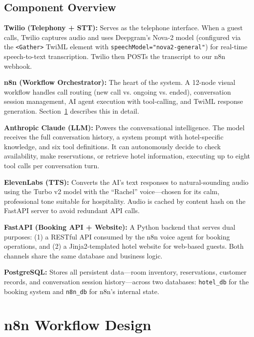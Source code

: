 \documentclass[conference]{IEEEtran}
\begin{document}
\subsection{Component Overview}

\textbf{Twilio (Telephony + STT):} Serves as the telephone interface. When a guest calls, Twilio captures audio and uses Deepgram's Nova-2 model (configured via the \texttt{<Gather>} TwiML element with \texttt{speechModel="nova2-general"}) for real-time speech-to-text transcription. Twilio then POSTs the transcript to our n8n webhook.

\textbf{n8n (Workflow Orchestrator):} The heart of the system. A 12-node visual workflow handles call routing (new call vs. ongoing vs. ended), conversation session management, AI agent execution with tool-calling, and TwiML response generation. Section~\ref{sec:workflow} describes this in detail.

\textbf{Anthropic Claude (LLM):} Powers the conversational intelligence. The model receives the full conversation history, a system prompt with hotel-specific knowledge, and six tool definitions. It can autonomously decide to check availability, make reservations, or retrieve hotel information, executing up to eight tool calls per conversation turn.

\textbf{ElevenLabs (TTS):} Converts the AI's text responses to natural-sounding audio using the Turbo v2 model with the ``Rachel'' voice---chosen for its calm, professional tone suitable for hospitality. Audio is cached by content hash on the FastAPI server to avoid redundant API calls.

\textbf{FastAPI (Booking API + Website):} A Python backend that serves dual purposes: (1) a RESTful API consumed by the n8n voice agent for booking operations, and (2) a Jinja2-templated hotel website for web-based guests. Both channels share the same database and business logic.

\textbf{PostgreSQL:} Stores all persistent data---room inventory, reservations, customer records, and conversation session history---across two databases: \texttt{hotel\_db} for the booking system and \texttt{n8n\_db} for n8n's internal state.

\section{n8n Workflow Design}
\label{sec:workflow}
\end{document}
